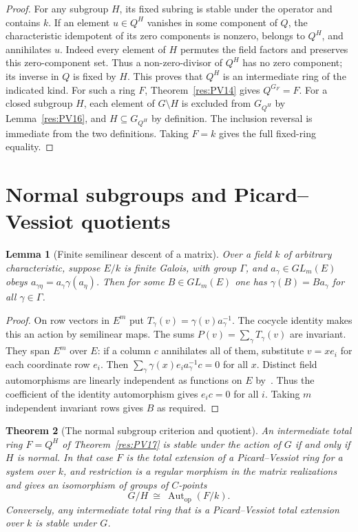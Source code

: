 \documentclass[11pt,oneside,openany]{book}
\newtheorem{theorem}{Theorem}[chapter]
\newtheorem{lemma}[theorem]{Lemma}
\theoremstyle{definition}
\theoremstyle{remark}
\begin{document}
\begin{proof}
For any subgroup \(H\), its fixed subring is stable under the
operator and contains \(k\). If an element \(u\in Q^H\) vanishes
in some component of \(Q\), the characteristic idempotent
of its zero components is nonzero, belongs to \(Q^H\), and
annihilates \(u\). Indeed every element of \(H\) permutes
the field factors and preserves this zero-component set.
Thus a non-zero-divisor of \(Q^H\) has no zero component;
its inverse in \(Q\) is fixed by \(H\). This proves that
\(Q^H\) is an intermediate ring of the indicated kind.
For such a ring \(F\), Theorem~\ref{res:PV14} gives \(Q^{G_F}=F\).
For a closed subgroup \(H\), each element of \(G\setminus H\)
is excluded from \(G_{Q^H}\) by Lemma~\ref{res:PV16}, and
\(H\subseteq G_{Q^H}\) by definition. The inclusion reversal
is immediate from the two definitions. Taking \(F=k\) gives
the full fixed-ring equality.
\end{proof}

\section{Normal subgroups and Picard--Vessiot quotients}

\begin{lemma}[Finite semilinear descent of a matrix]
\label{res:PV18}
Over a field \(k\) of arbitrary characteristic, suppose \(E/k\) is
finite Galois, with group \(\Gamma\), and \(a_\gamma\in GL_m(E)\) obeys
\(a_{\gamma\eta}=a_\gamma\gamma(a_\eta)\).
Then for some \(B\in GL_m(E)\) one has
\(\gamma(B)=B a_\gamma\) for all \(\gamma\in\Gamma\).
\end{lemma}

\begin{proof}
On row vectors in \(E^m\) put \(T_\gamma(v)=\gamma(v)a_\gamma^{-1}\).
The cocycle identity makes this an action by semilinear maps.
The sums \(P(v)=\sum_\gamma T_\gamma(v)\) are invariant.
They span \(E^m\) over \(E\): if a column \(c\) annihilates all
of them, substitute \(v=x e_i\) for each coordinate row \(e_i\).
Then \(\sum_\gamma \gamma(x)e_i a_\gamma^{-1}c=0\) for all \(x\).
Distinct field automorphisms are linearly independent as functions
on \(E\) by~\cite[Lemma 16.6, PDF p.~125]{mg-d07}.
Thus the coefficient of the identity automorphism gives
\(e_i c=0\) for all \(i\).
Taking \(m\) independent invariant rows gives \(B\) as required.
\end{proof}

\begin{theorem}[The normal subgroup criterion and quotient]
\label{res:PV19}
An intermediate total ring \(F=Q^H\) of Theorem~\ref{res:PV17}
is stable under the action of \(G\) if and only if \(H\)
is normal. In that case \(F\) is the total extension of a
Picard--Vessiot ring for a system over \(k\), and restriction
is a regular morphism in the matrix realizations and gives an
isomorphism of groups of \(C\)-points
\[
 G/H \ \cong\ \operatorname{Aut}_{\mathrm{op}}(F/k).
\]
Conversely, any intermediate total ring that is a
Picard--Vessiot total extension over \(k\) is stable under \(G\).
\end{theorem}
\end{document}
